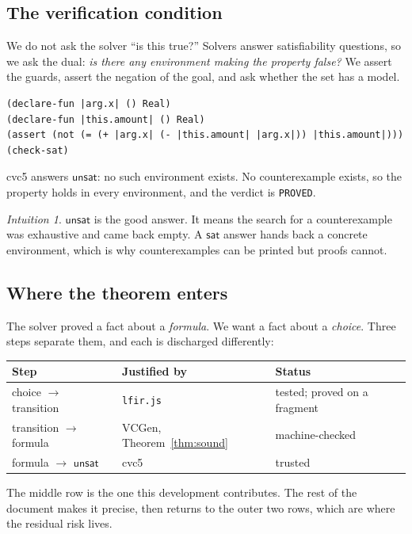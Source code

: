 \documentclass[11pt,a4paper]{article}
\newcommand{\VC}{\mathrm{VCGen}}
\newcommand{\unsat}{\mathsf{unsat}}
\newcommand{\sat}{\mathsf{sat}}
\newcommand{\code}[1]{\texttt{#1}}
\theoremstyle{definition}
\theoremstyle{plain}
\theoremstyle{remark}
\newtheorem*{intuition}{Intuition}
\begin{document}
\subsection{The verification condition}

We do not ask the solver ``is this true?'' Solvers answer satisfiability
questions, so we ask the dual: \emph{is there any environment making the
property false?} We assert the guards, assert the negation of the goal, and ask
whether the set has a model.

\begin{lstlisting}
(declare-fun |arg.x| () Real)
(declare-fun |this.amount| () Real)
(assert (not (= (+ |arg.x| (- |this.amount| |arg.x|)) |this.amount|)))
(check-sat)
\end{lstlisting}

\noindent
cvc5 answers $\unsat$: no such environment exists. No counterexample exists,
so the property holds in every environment, and the verdict is \code{PROVED}.

\begin{intuition}
$\unsat$ is the good answer. It means the search for a counterexample was
exhaustive and came back empty. A $\sat$ answer hands back a concrete
environment, which is why counterexamples can be printed but proofs cannot.
\end{intuition}

\subsection{Where the theorem enters}

The solver proved a fact about a \emph{formula}. We want a fact about a
\emph{choice}. Three steps separate them, and each is discharged differently:

\begin{center}
\begin{tabular}{@{}lll@{}}
\toprule
Step & Justified by & Status \\
\midrule
choice $\to$ transition & \code{lfir.js} & tested; proved on a fragment \\
transition $\to$ formula & $\VC$, Theorem~\ref{thm:sound} & machine-checked \\
formula $\to$ $\unsat$ & cvc5 & trusted \\
\bottomrule
\end{tabular}
\end{center}

\noindent
The middle row is the one this development contributes. The rest of the
document makes it precise, then returns to the outer two rows, which are where
the residual risk lives.
\end{document}
